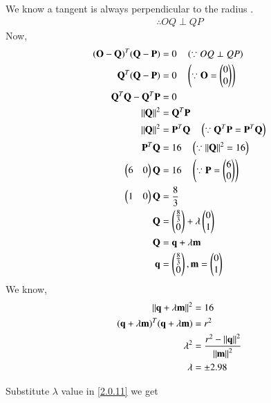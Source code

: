 \documentclass[journal,12pt,twocolumn]{IEEEtran}
\begin{document}
We know a tangent is always perpendicular to the radius .
\begin{align}
\therefore OQ \perp QP
\end{align}
Now,
\begin{align}
(\mathbf{O}-\mathbf{Q})^T (\mathbf{Q}-\mathbf{P}) &= 0 \quad \left(\because OQ \perp QP \right)
\\
\mathbf{Q}^T(\mathbf{Q}-\mathbf{P}) &= 0 \quad \left(\because \mathbf{O}=\begin{pmatrix}0\\0\end{pmatrix}\right)
\\
\mathbf{Q}^T \mathbf{Q} - \mathbf{Q}^T \mathbf{P} &= 0  
\\
\left\lVert\mathbf{Q}\right\rVert^2 &= \mathbf{Q}^T \mathbf{P}
\\
\left\lVert\mathbf{Q}\right\rVert^2 &= \mathbf{P}^T \mathbf{Q}  \quad \left(\because \mathbf{Q}^T \mathbf{P} = \mathbf{P}^T \mathbf{Q}\right)
\\
\mathbf{P}^T \mathbf{Q} &= 16 \quad \left(\because \left\lVert\mathbf{Q}\right\rVert^2 = 16\right)
\\
\begin{pmatrix}6&0\end{pmatrix} \mathbf{Q} &= 16 \quad \left(\because \mathbf{P} = \begin{pmatrix}6\\0\end{pmatrix} \right)
\\
\begin{pmatrix}1&0\end{pmatrix} \mathbf{Q} &= \frac{8}{3}
\\
\mathbf{Q} &= \begin{pmatrix}\frac{8}{3}\\0\end{pmatrix} + \lambda \begin{pmatrix}0\\1\end{pmatrix} \label{2.0.11} 
\\
\mathbf{Q}&=\mathbf{q}+\lambda\mathbf{m} 
\\
\mathbf{q}&=\begin{pmatrix}\frac{8}{3}\\ 0\end{pmatrix},\mathbf{m}=\begin{pmatrix}0\\1\end{pmatrix}
\end{align}
We know,
\begin{align}
\left\lVert\mathbf{q}+\lambda\mathbf{m}\right\rVert^2&=16
\\
(\mathbf{q}+\lambda \mathbf{m})^T(\mathbf{q}+\lambda \mathbf{m})&=r^2
\\
\lambda^2&=\frac{r^2-\left\lVert\mathbf{q}\right\rVert^2}{\left\lVert\mathbf{m}\right\rVert^2}
\\
\lambda &= \pm 2.98
\end{align}

Substitute $\lambda$  value in \eqref{2.0.11} we get
\end{document}
